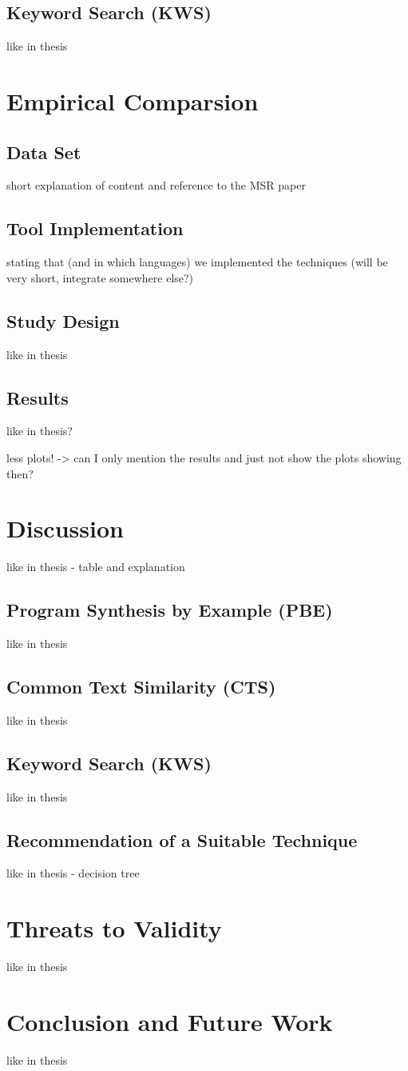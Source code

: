 \subsection{Keyword Search (KWS)}
like in thesis

\section{Empirical Comparsion}
\subsection{Data Set}
short explanation of content and reference to the MSR paper
\subsection{Tool Implementation}
stating that (and in which languages) we implemented the techniques (will be very short, integrate somewhere else?)
\subsection{Study Design}
like in thesis
\subsection{Results}
like in thesis?

less plots! -> can I only mention the results and just not show the plots showing then?

\section{Discussion}
like in thesis - table and explanation
\subsection{Program Synthesis by Example (PBE)}
like in thesis
\subsection{Common Text Similarity (CTS)}
like in thesis
\subsection{Keyword Search (KWS)}
like in thesis
\subsection{Recommendation of a Suitable Technique}
like in thesis - decision tree

\section{Threats to Validity}
like in thesis

\section{Conclusion and Future Work}
like in thesis


